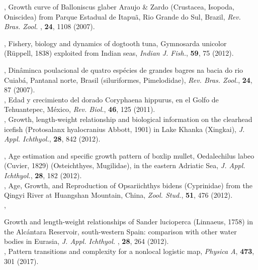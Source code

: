 \documentclass[10pt]{iopart}
\begin{document}
\begin{thebibliography}{100}
, {Growth curve of Balloniscus glaber Araujo \& Zardo (Crustacea, Isopoda, Oniscidea) from Parque Estadual de Itapuã, Rio Grande do Sul, Brazil}, \textit{Rev. Bras. Zool. }, \textbf{24}, {1108} {(2007)}.

, {Fishery, biology and dynamics of dogtooth tuna, Gymnosarda unicolor (Rüppell, 1838) exploited from Indian seas}, \textit{Indian J. Fish.}, \textbf{59}, {75} {(2012)}.

, {Din\^{a}minca poulacional de quatro esp\'{e}cies de grandes bagres na bacia do rio Cuiab\'{a}, Pantanal norte, Brasil (siluriformes, Pimelodidae)}, \textit{ Rev. Bras. Zool.}, \textbf{24}, 87 {(2007)}.\\

, {Edad y crecimiento del dorado Coryphaena hippurus, en el Golfo de Tehuantepec, México}, \textit{Rev. Biol.}, \textbf{46}, 125 {(2011)}.\\

, {Growth, length-weight relationship and biological information on the clearhead icefish (Protosalanx hyalocranius Abbott, 1901) in Lake Khanka (Xingkai)}, \textit{J. Appl. Ichthyol.}, \textbf{28}, 842 {(2012)}.

, {Age estimation and specific growth pattern of boxlip mullet, Oedalechilus labeo (Cuvier, 1829) (Osteichthyes, Mugilidae), in the eastern Adriatic Sea}, \textit{J. Appl. Ichthyol.}, \textbf{28}, 182 (2012). \\

, {Age, Growth, and Reproduction of Opsariichthys bidens    (Cyprinidae) from the Qingyi River at Huangshan Mountain, China}, \textit{Zool. Stud.}, \textbf{51}, 476 {(2012)}. \\

, {Growth and length-weight relationships of Sander lucioperca (Linnaeus, 1758) in the Alc{\'{a}ntara Reservoir, south-western Spain: comparison with other water bodies in Eurasia}, \textit{J. Appl. Ichthyol. }, \textbf{28}, 264 {(2012)}. \\

, {Pattern transitions and complexity for a nonlocal logistic map}, \textit{Physica A}, \textbf{473}, {301} {(2017)}.

}
\end{thebibliography}
\end{document}
